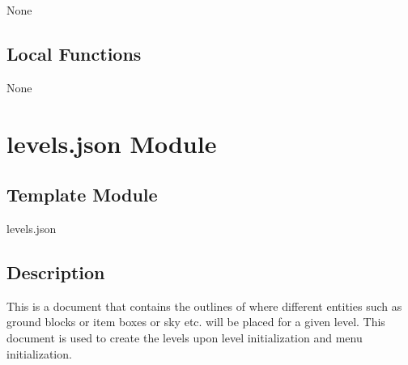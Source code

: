 \documentclass[12pt]{article}
\begin{document}
None

\subsection {Local Functions}

None

\newpage

\section {levels.json Module}

\subsection{Template Module}

levels.json

\subsection {Description}

This is a document that contains the outlines of where different entities such as ground blocks or item boxes or sky etc. will be placed for a given level. This document is used to create the levels upon level initialization and menu initialization.
\end{document}
